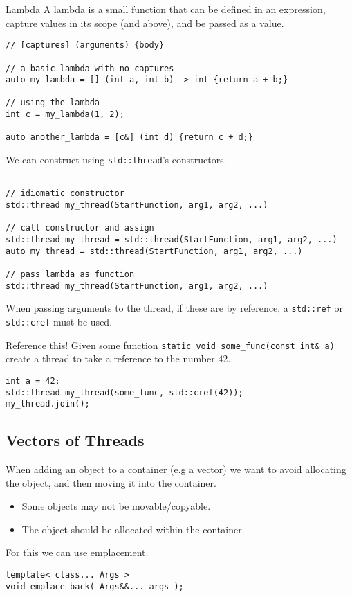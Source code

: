 \begin{definitionbox}{Lambda}
	A lambda is a small function that can be defined in an expression, capture values in its scope (and above), and be passed as a value.
	\begin{verbatim}
// [captures] (arguments) {body}

// a basic lambda with no captures
auto my_lambda = [] (int a, int b) -> int {return a + b;}

// using the lambda
int c = my_lambda(1, 2);

auto another_lambda = [c&] (int d) {return c + d;}
    \end{verbatim}
\end{definitionbox}
We can construct using \texttt{std::thread}'s constructors.
\begin{verbatim}

// idiomatic constructor
std::thread my_thread(StartFunction, arg1, arg2, ...)

// call constructor and assign
std::thread my_thread = std::thread(StartFunction, arg1, arg2, ...)
auto my_thread = std::thread(StartFunction, arg1, arg2, ...)

// pass lambda as function
std::thread my_thread(StartFunction, arg1, arg2, ...)
\end{verbatim}

When passing arguments to the thread, if these are by reference, a \texttt{std::ref} or \texttt{std::cref} must be used.

\begin{examplebox}{Reference this!}
	Given some function \texttt{static void some_func(const int& a)} create a thread to take a reference to the number $42$.
	\tcblower
	\begin{verbatim}
int a = 42;
std::thread my_thread(some_func, std::cref(42));
my_thread.join();  
  \end{verbatim}
\end{examplebox}

\subsection{Vectors of Threads}
When adding an object to a container (e.g a vector) we want to avoid allocating the object, and then moving it into the container.
\begin{itemize}
	\item Some objects may not be movable/copyable.
	\item The object should be allocated within the container.
\end{itemize}
For this we can use emplacement.
\begin{verbatim}
template< class... Args >
void emplace_back( Args&&... args );
\end{verbatim}

